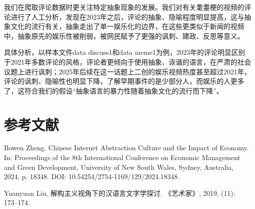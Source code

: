 \documentclass[12pt,a4paper]{ctexart}
\begin{document}

我们在爬取评论数据时更关注特定抽象现象的发展。我们对有关耄耋梗的视频的评论进行了人工分析，发现在2023年之后，评论的抽象、隐喻程度明显提高，这与抽象文化的流行有关，抽象走出了单一娱乐化的边界，在这些更类似于新闻的视频中，抽象原先的娱乐性被削弱，被网民赋予了更强的讽刺、建政、反思等意义。

具体分析，以样本文件data discuss1和data meme1为例，2023年的评论明显区别于2021年多数评论的风格，评论者更倾向于使用抽象、诙谐的语言，在严肃的社会议题上进行讽刺；2025年后续在这一话题上二创的娱乐视频热度甚至超过2021年，评论的讽刺、隐喻性也明显下降，了解早期事件的是少部分人，而娱乐的人更多了，这符合我们的假设“抽象语言的暴力性随着抽象文化的流行而下降”。

\section{参考文献}

\begin{thebibliography}{99}

Bowen Zheng.
\newblock Chinese Internet Abstraction Culture and the Impact of Economy.
\newblock In: Proceedings of the 8th International Conference on Economic Management and Green Development, University of New South Wales, Sydney, Australia, 2024, p. 18348.
\newblock DOI: 10.54254/2754-1169/129/2024.18348.

Yuanyuan Liu.
\newblock 解构主义视角下的汉语言文字学探讨.
\newblock 《艺术家》, 2019, (11): 173--174.

\end{thebibliography}
\end{document}
